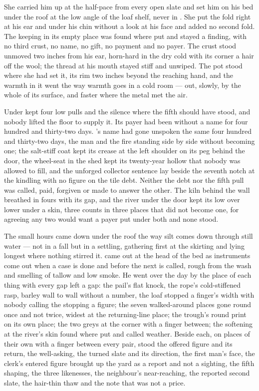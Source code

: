 She carried him up  at the half-pace from every open slate and set him on his bed under the roof at the low angle of the loaf shelf, never in . She put the fold right at his ear and under his chin without a look at his face and added no second fold. The keeping in its empty place was found where put and stayed a finding, with no third crust, no name, no gift, no payment and no payer. The crust stood unmoved two inches from his ear, horn-hard in the dry cold with its corner a hair off the wool; the thread at his mouth stayed stiff and unwiped. The pot stood where she had set it, its rim two inches beyond the reaching hand, and the warmth in it went the way warmth goes in a cold room --- out, slowly, by the whole of its surface, and faster where the metal met the air.

Under   kept four low pulls and the silence where the fifth should have stood, and nobody lifted the floor to supply it. Its payer had been without a name for four hundred and thirty-two days. 's name had gone unspoken the same four hundred and thirty-two days, the man and the fire standing side by side without becoming one; the salt-stiff coat kept its crease at the left shoulder on its peg behind the door, the wheel-seat in the shed kept its twenty-year hollow that nobody was allowed to fill, and the unforged collector sentence lay beside the seventh notch at the kindling with no figure on the tile debt. Neither the debt nor the fifth pull was called, paid, forgiven or made to answer the other. The kiln behind the wall breathed in fours with its gap, and the river under the door kept its low over lower under a skin, three counts in three places that did not become one, for agreeing any two would want a payer put under both and none stood.

\scenebreak

The small hours came down under the roof the way silt comes down through still water --- not in a fall but in a settling, gathering first at the skirting and lying longest where nothing stirred it.  came out at the head of the bed as instruments come out when a case is done and before the next is called, rough from the wash and smelling of tallow and low smoke. He went over the day by the place of each thing with every gap left a gap: the pail's flat knock, the rope's cold-stiffened rasp, barley wall to wall without a number, the loaf stopped a finger's width with nobody calling the stopping a figure; the seven walked-around places gone round once and not twice, widest at the returning-line place; the trough's round print on its own place; the two greys at the corner with a finger between; the softening at the river's skin found where put and called weather. Beside each, on places of their own with a finger between every pair, stood the offered figure and its return, the well-asking, the turned slate and its direction, the first man's face, the clerk's entered figure brought up the yard as a report and not a sighting, the fifth shaping, the three likenesses, the neighbour's near-reaching, the reported second slate, the hair-thin thaw and the note that was not a price.

